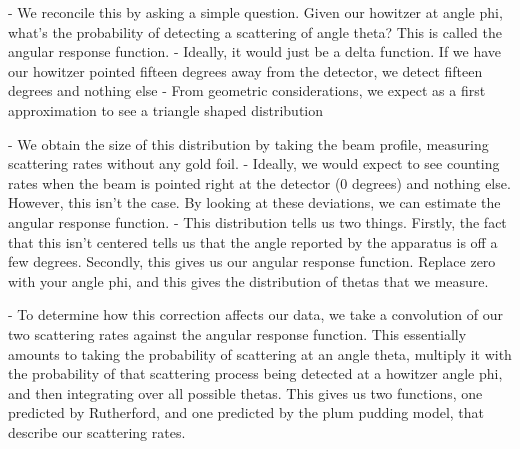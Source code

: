 - We reconcile this by asking a simple question. Given our howitzer at angle phi, what's the probability of detecting a scattering of angle theta? This is called the angular response function.
- Ideally, it would just be a delta function. If we have our howitzer pointed fifteen degrees away from the detector, we detect fifteen degrees and nothing else
- From geometric considerations, we expect as a first approximation to see a triangle shaped distribution

- We obtain the size of this distribution by taking the beam profile, measuring scattering rates without any gold foil.
- Ideally, we would expect to see counting rates when the beam is pointed right at the detector (0 degrees) and nothing else. However, this isn't the case. By looking at these deviations, we can estimate the angular response function.
- This distribution tells us two things. Firstly, the fact that this isn't centered tells us that the angle reported by the apparatus is off a few degrees. Secondly, this gives us our angular response function. Replace zero with your angle phi, and this gives the distribution of thetas that we measure.

- To determine how this correction affects our data, we take a convolution of our two scattering rates against the angular response function. This essentially amounts to taking the probability of scattering at an angle theta, multiply it with the probability of that scattering process being detected at a howitzer angle phi, and then integrating over all possible thetas. This gives us two functions, one predicted by Rutherford, and one predicted by the plum pudding model, that describe our scattering rates.
